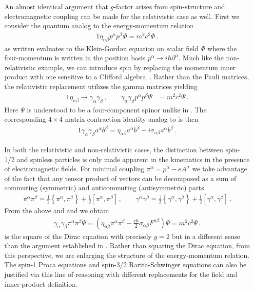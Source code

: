 An almost identical argument that $g$-factor arises from spin-structure and electromagnetic coupling can be made for the relativistic case as well. First we consider the quantum analog to the energy-momentum relation
\begin{alignat}{1}
	\label{analog:1} \eta_{\alpha\beta}p^{\alpha}p^{\beta}\Phi=m^{2}c^{2}\Phi\,.
\end{alignat}
 as written evaluates to the Klein-Gordon equation on scalar field $\Phi$ where the four-momentum is written in the position basis $p^{\alpha}\rightarrow i\hbar\partial^{\alpha}$. Much like the non-relativistic example, we can introduce spin by replacing the momentum inner product with one sensitive to a Clifford algebra~\citep{Weinberg:1995mt}. Rather than the Pauli matrices, the relativistic replacement utilizes the gamma matrices yielding
\begin{alignat}{1}
	\label{eq:spin:03}
    \eta_{\alpha\beta}\rightarrow\gamma_{\alpha}\gamma_{\beta}\,,\qquad
    \gamma_{\alpha}\gamma_{\beta}p^{\alpha}p^{\beta}\Psi&=m^{2}c^{2}\Psi\,.
\end{alignat}
Here $\Psi$ is understood to be a four-component spinor unlike in . The corresponding $4\times4$ matrix contraction identity analog to  is then
\begin{alignat}{1}
	\label{eq:spin:04} \gamma_{\alpha}\gamma_{\beta}a^{\alpha}b^{\beta}=\eta_{\alpha\beta}a^{\alpha}b^{\beta}-i\sigma_{\alpha\beta}a^{\alpha}b^{\beta}\,.
\end{alignat}

In both the relativistic and non-relativistic cases, the distinction between spin-1/2 and spinless particles is only made apparent in the kinematics in the presence of electromagnetic fields. For minimal coupling $\pi^{\alpha}=p^{\alpha}-eA^{\alpha}$ we take advantage of the fact that any tensor product of vectors can be decomposed as a sum of commuting (symmetric) and anticommuting (antisymmetric) parts
\begin{align}
	\label{eq:spin:06} \pi^{\alpha}\pi^{\beta}=\frac{1}{2}\left\{\pi^{\alpha},\pi^{\beta}\right\}+
    \frac{1}{2}\left[\pi^{\alpha},\pi^{\beta}\right]\,,\qquad
    \gamma^{\alpha}\gamma^{\beta}=\frac{1}{2}\left\{\gamma^{\alpha},\gamma^{\beta}\right\}+
    \frac{1}{2}\left[\gamma^{\alpha},\gamma^{\beta}\right]\,.
\end{align}
From the above and  and  we obtain
\begin{align}
	\label{eq:spin:07b} \gamma_{\alpha}\gamma_{\beta}\pi^{\alpha}\pi^{\beta}\Psi=
    \left(\eta_{\alpha\beta}\pi^{\alpha}\pi^{\beta}-\frac{e\hbar}{2}\sigma_{\alpha\beta}F^{\alpha\beta}\right)\Psi=m^{2}c^{2}\Psi\,.
\end{align}
 is the square of the Dirac equation with precisely $g\!=\!2$ but in a different sense than the argument established in . Rather than squaring the Dirac equation, from this perspective, we are enlarging the structure of the energy-momentum relation. The spin-1 Proca equations and spin-3/2 Rarita-Schwinger equations can also be justified via this line of reasoning with different replacements for the field and inner-product definition.

